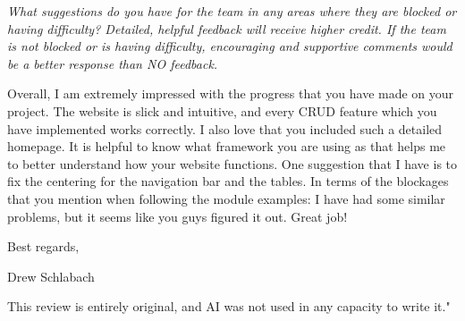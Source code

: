\documentclass{article}
\begin{document}
\begin{tcolorbox}[colback=secondarycolor, colframe=primarycolor, title=\textbf{Step 4: Peer Review 3 - Drew Schlabach}]
\vspace{0.2cm}
\textit{What suggestions do you have for the team in any areas where they are blocked or having difficulty? Detailed, helpful feedback will receive higher credit. If the team is not blocked or is having difficulty, encouraging and supportive comments would be a better response than NO feedback.}

\vspace{0.05cm}
Overall, I am extremely impressed with the progress that you have made on your project. The website is slick and intuitive, and every CRUD feature which you have implemented works correctly. I also love that you included such a detailed homepage. It is helpful to know what framework you are using as that helps me to better understand how your website functions. One suggestion that I have is to fix the centering for the navigation bar and the tables. In terms of the blockages that you mention when following the module examples: I have had some similar problems, but it seems like you guys figured it out. Great job! 

\vspace{0.2cm}
Best regards,

\vspace{0.05cm}
Drew Schlabach

\vspace{0.2cm}
This review is entirely original, and AI was not used in any capacity to write it."

\end{tcolorbox}

\vspace{0.2cm}
\end{document}
